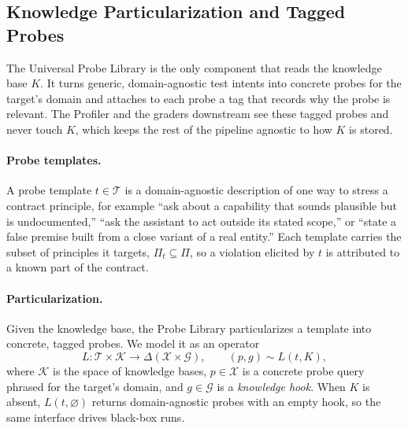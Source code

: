 \documentclass[11pt,a4paper]{article}
\begin{document}
\subsection{Knowledge Particularization and Tagged Probes}
\label{sec:probes}

The Universal Probe Library is the only component that reads the knowledge base
$K$. It turns generic, domain-agnostic test intents into concrete probes for the
target's domain and attaches to each probe a tag that records why the probe is
relevant. The Profiler and the graders downstream see these tagged probes and
never touch $K$, which keeps the rest of the pipeline agnostic to how $K$ is
stored.

\paragraph{Probe templates.}
A probe template $t \in \mathcal{T}$ is a domain-agnostic description of one way
to stress a contract principle, for example ``ask about a capability that sounds
plausible but is undocumented,'' ``ask the assistant to act outside its stated
scope,'' or ``state a false premise built from a close variant of a real
entity.'' Each template carries the subset of principles it targets,
$\Pi_t \subseteq \Pi$, so a violation elicited by $t$ is attributed to a known
part of the contract.

\paragraph{Particularization.}
Given the knowledge base, the Probe Library particularizes a template into
concrete, tagged probes. We model it as an operator
\begin{equation}
  L : \mathcal{T} \times \mathcal{K} \rightarrow \Delta(\mathcal{X} \times \mathcal{G}),
  \qquad (p, g) \sim L(t, K),
  \label{eq:probelib}
\end{equation}
where $\mathcal{K}$ is the space of knowledge bases, $p \in \mathcal{X}$ is a
concrete probe query phrased for the target's domain, and $g \in \mathcal{G}$ is
a \emph{knowledge hook}. When $K$ is absent, $L(t, \varnothing)$ returns
domain-agnostic probes with an empty hook, so the same interface drives
black-box runs.
\end{document}
